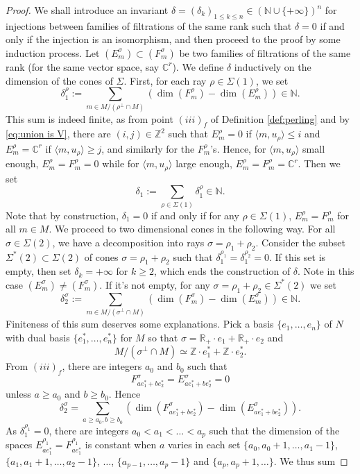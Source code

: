 \documentclass[a4paper,10pt]{amsart}
\theoremstyle{plain}{
    \newtheorem{theorem}{Theorem}[section]
    \newtheorem{lemma}[theorem]{Lemma}
    \newtheorem{corollary}[theorem]{Corollary}
    \newtheorem{proposition}[theorem]{Proposition}
    \newtheorem{conjecture}[theorem]{Conjecture}
}
\theoremstyle{definition}{
    \newtheorem{definition}[theorem]{Definition}
    \newtheorem{defn-thm}[theorem]{Definition-Theorem}
    \newtheorem{example}[theorem]{Example}
    \newtheorem{notation}[theorem]{Notation}
}
\theoremstyle{remark}{
    \newtheorem{remark}[theorem]{Remark}
    \newtheorem{problem}[theorem]{Problem}
    \newtheorem{question}[theorem]{Question}
}
\def\R{\mathbb{R}}
\def\Z{\mathbb{Z}}
\def\N{\mathbb{N}}
\def\C{\mathbb{C}}
\begin{document}
\begin{proof}
 We shall introduce an invariant $\delta=(\delta_k)_{1\leq k\leq n}\in(\N\cup\lbrace +\infty\rbrace)^n$ for injections between families of filtrations of the same rank such that $\delta=0$ if and only if the injection is an isomorphism, and then proceed to the proof by some induction process. Let $(E^\sigma_m)\subset (F^\sigma_m)$ be two families of filtrations of the same rank (for the same vector space, say $\C^r$). We define $\delta$ inductively on the dimension of the cones of $\Sigma$. First, for each ray $\rho\in\Sigma(1)$, we set
 $$
 \delta_1^\rho:=\sum_{m\in M/(\rho^\perp\cap M)}( \dim(F^\rho_m)-\dim(E^\rho_m))\in \N.
 $$
 This sum is indeed finite, as from point $(iii)_f$ of Definition \ref{def:perling} and by \eqref{eq:union is V}, there are $(i,j)\in\Z^2$ such that $E^\rho_m=0$ if $\langle m, u_\rho\rangle \leq i$ and $E^\rho_m=\C^r$ if $\langle m, u_\rho\rangle \geq j$, and similarly for the $F^\rho_m$'s. Hence, for $\langle m, u_\rho\rangle$ small enough, $E^\rho_m=F^\rho_m=0$ while for $\langle m, u_\rho\rangle$ large enough, $E^\rho_m=F^\rho_m=\C^r$. Then we set 
 $$
 \delta_1:=\sum_{\rho\in\Sigma(1)} \delta_1^\rho\in\N.
 $$
 Note that by construction, $\delta_1=0$ if and only if for any $\rho\in\Sigma(1)$, $E_m^\rho=F_m^\rho$ for all $m\in M$. We proceed to two dimensional cones in the following way. For all $\sigma\in\Sigma(2)$, we have a decomposition into rays $\sigma=\rho_1+\rho_2$. Consider the subset $\Sigma^*(2)\subset\Sigma(2)$ of cones $\sigma=\rho_1+\rho_2$ such that $\delta_1^{\rho_1}=\delta_1^{\rho_2}=0$. If this set is empty, then set $\delta_k=+\infty$ for $k\geq 2$, which ends the construction of $\delta$. Note in this case $(E_m^\sigma)\neq(F_m^\sigma)$. If it's not empty, for any $\sigma=\rho_1+\rho_2\in \Sigma^*(2)$ we set 
 $$
 \delta_2^\sigma:=\sum_{m\in M/(\sigma^\perp\cap M)} (\dim(F^\sigma_m)-\dim(E^\sigma_m))\in \N.
 $$
 Finiteness of this sum deserves some explanations. Pick a basis $\lbrace e_1,\ldots,e_n\rbrace$ of $N$ with dual basis $\lbrace e_1^*,\ldots,e_n^*\rbrace$ for $M$ so that $\sigma=\R_+\cdot e_1 + \R_+\cdot e_2$ and
 $$
 M/(\sigma^\perp\cap M)\simeq \Z\cdot e_1^*+\Z\cdot e_2^*.
 $$
 From $(iii)_f$, there are integers $a_0$ and $b_0$ such that $$F^\sigma_{a e_1^*+b e_2^*}=E^\sigma_{a e_1^*+b e_2^*} =0$$ unless $a\geq a_0$ and $b\geq b_0$. Hence
 $$
 \delta_2^\sigma=\sum_{ a\geq a_0, b\geq b_0}( \dim(F^\sigma_{a e_1^* + b e_2^*})-\dim(E^\sigma_{a e_1^* + b e_2^*})).
 $$
 As $\delta_1^{\rho_1}=0$, there are integers $a_0 < a_1 <\ldots< a_p$ such that the dimension of the spaces $E^{\rho_1}_{a e_1^*}=F^{\rho_1}_{a e_1^*}$ is constant when $a$ varies in each set $\lbrace a_0,a_0+1,\ldots,a_1-1\rbrace$, $\lbrace a_1,a_1+1,\ldots,a_2-1\rbrace$, $\ldots$, $\lbrace a_{p-1},\ldots, a_p-1\rbrace$ and $\lbrace a_p, a_p+1,\ldots \rbrace$. We thus sum

\end{proof}
\end{document}
